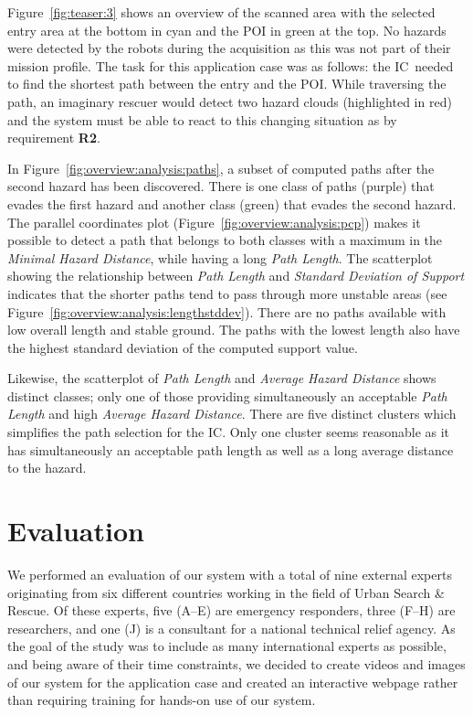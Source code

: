\documentclass[conference,10pt,letter]{IEEEtran}
\def\IC{IC}
\begin{document}
Figure~\ref{fig:teaser:3} shows an overview of the scanned area with the selected entry area at the bottom in cyan and the POI in green at the top. No hazards were detected by the robots during the acquisition as this was not part of their mission profile. The task for this application case was as follows: the \IC\ needed to find the shortest path between the entry and the POI. While traversing the path, an imaginary rescuer would detect two hazard clouds (highlighted in red) and the system must be able to react to this changing situation as by requirement {\bfseries R2}.

In Figure~\ref{fig:overview:analysis:paths}, a subset of computed paths after the second hazard has been discovered. There is one class of paths (purple) that evades the first hazard and another class (green) that evades the second hazard. The parallel coordinates plot (Figure~\ref{fig:overview:analysis:pcp}) makes it possible to detect a path that belongs to both classes with a maximum in the \emph{Minimal Hazard Distance}, while having a long \emph{Path Length}. The scatterplot showing the relationship between \emph{Path Length} and \emph{Standard Deviation of Support} indicates that the shorter paths tend to pass through more unstable areas (see Figure~\ref{fig:overview:analysis:lengthstddev}). There are no paths available with low overall length and stable ground. The paths with the lowest length also have the highest standard deviation of the computed support value.

Likewise, the scatterplot of \emph{Path Length} and \emph{Average Hazard Distance} shows distinct classes; only one of those providing simultaneously an acceptable \emph{Path Length} and high \emph{Average Hazard Distance}. There are five distinct clusters which simplifies the path selection for the \IC . Only one cluster seems reasonable as it has simultaneously an acceptable path length as well as a long average distance to the hazard.


\section{Evaluation} \label{sec:evaluation}
We performed an evaluation of our system with a total of nine external experts originating from six different countries working in the field of Urban Search \& Rescue. Of these experts, five (A--E) are emergency responders, three (F--H) are researchers, and one (J) is a consultant for a national technical relief agency. As the goal of the study was to include as many international experts as possible, and being aware of their time constraints, we decided to create videos and images of our system for the application case and created an interactive webpage rather than requiring training for hands-on use of our system.
\end{document}
